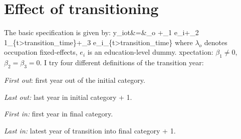 \section{Effect of transitioning}
The basic specification is given by:
\beqn
	y_{iot}&=&\lambda_o +\beta_1 e_i+\beta_2 1_{\{t>transition\_time\}}+\beta_3 e_i_{\{t>transition\_time\}}
\eeqn
where $\lambda_o$ denotes occupation fixed-effects, $e_i$ is an education-level dummy. xpectation: $\beta_1\neq0$, $\beta_2=\beta_3=0$. I try four different definitions of the transition year:
\bitem
	\item \textit{First out}: first year out of the initial category.
	\item \textit{Last out:} last year in initial category + 1.
	\item \textit{First in: } first year in final category.
	\item \textit{Last in:} latest year of transition into final category + 1.
\eitem



\FloatBarrier


{ \footnotesize
	
	
	
	
		
}

